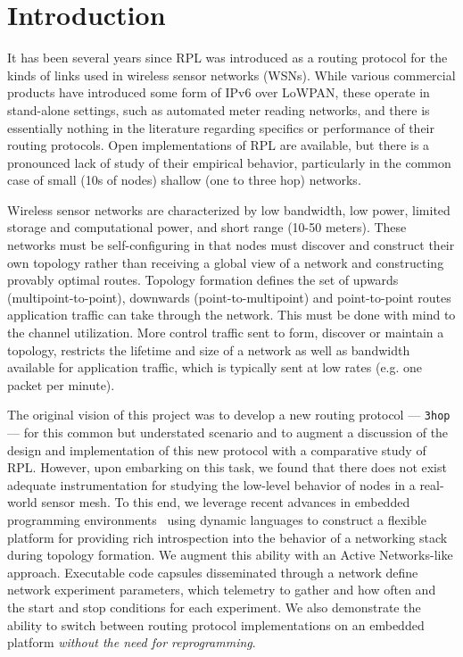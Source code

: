 \section{Introduction}

It has been several years since RPL was introduced as a routing protocol for the kinds of links used in wireless sensor networks (WSNs).
While various commercial products have introduced some form of IPv6 over LoWPAN, these operate in stand-alone settings, such as automated meter reading networks, and there is essentially nothing in the literature regarding specifics or performance of their routing protocols.
Open implementations of RPL are available, but there is a pronounced lack of study of their empirical behavior, particularly in the common case of small (10s of nodes) shallow (one to three hop) networks.

Wireless sensor networks are characterized by low bandwidth, low power, limited storage and computational power, and short range (10-50 meters).
These networks must be self-configuring in that nodes must discover and construct their own topology rather than receiving a global view of a network and constructing provably optimal routes.
Topology formation defines the set of upwards (multipoint-to-point), downwards (point-to-multipoint) and point-to-point routes application traffic can take through the network.
This must be done with mind to the channel utilization.
More control traffic sent to form, discover or maintain a topology, restricts the lifetime and size of a network as well as bandwidth available for application traffic, which is typically sent at low rates (e.g. one packet per minute).

The original vision of this project was to develop a new routing protocol --- \texttt{3hop} --- for this common but understated scenario and to augment a discussion of the design and implementation of this new protocol with a comparative study of RPL.
However, upon embarking on this task, we found that there does not exist adequate instrumentation for studying the low-level behavior of nodes in a real-world sensor mesh.
To this end, we leverage recent advances in embedded programming environments~\cite{andersen2016system} using dynamic languages to construct a flexible platform for providing rich introspection into the behavior of a networking stack during topology formation.
We augment this ability with an Active Networks-like approach.
Executable code capsules disseminated through a network define network experiment parameters, which telemetry to gather and how often and the start and stop conditions for each experiment.
We also demonstrate the ability to switch between routing protocol implementations on an embedded platform \emph{without the need for reprogramming}.

